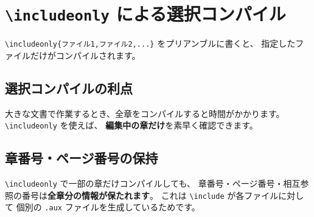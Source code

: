 
\chapter{\texttt{\textbackslash includeonly} による選択コンパイル}

\texttt{\textbackslash includeonly\{ファイル1,ファイル2,...\}} をプリアンブルに書くと、
指定したファイルだけがコンパイルされます。

\section{選択コンパイルの利点}

大きな文書で作業するとき、全章をコンパイルすると時間がかかります。
\texttt{\textbackslash includeonly} を使えば、
\textbf{編集中の章だけ}を素早く確認できます。

\section{章番号・ページ番号の保持}

\texttt{\textbackslash includeonly} で一部の章だけコンパイルしても、
章番号・ページ番号・相互参照の番号は\textbf{全章分の情報が保たれます}。
これは \texttt{\textbackslash include} が各ファイルに対して
個別の \texttt{.aux} ファイルを生成しているためです。

